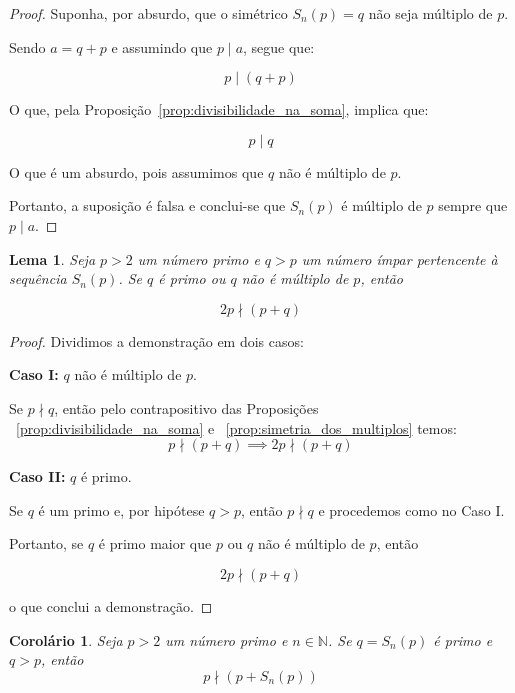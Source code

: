 \documentclass[a4paper,11pt]{article}
\newtheorem{lemma}[theorem]{Lema}
\newtheorem{corollary}[theorem]{Corolário}
\theoremstyle{definition}
\theoremstyle{remark}
\begin{document}
\begin{otherlanguage}{brazil}
	\begin{proof}
		Suponha, por absurdo, que o simétrico \(S_n(p) = q\) não seja múltiplo de \(p\). 
		
		Sendo \(a = q + p\) e assumindo que \(p \mid a\), segue que:
		
		\[
		p \mid (q + p)
		\]
		
		O que, pela Proposição~\ref{prop:divisibilidade_na_soma}, implica que:
		
		\[
		p \mid q
		\]
		
		O que é um absurdo, pois assumimos que \(q\) não é múltiplo de \(p\).
		
		Portanto, a suposição é falsa e conclui-se que \(S_n(p)\) é múltiplo de \(p\) sempre que \(p \mid a\).
	\end{proof}
	
	\begin{lemma}\label{lema:multip}
		Seja \(p > 2\) um número primo e \(q > p\) um número ímpar pertencente à sequência \(S_n(p)\). Se \(q\) é primo ou \(q\) não é múltiplo de \(p\), então
		
		\[
		2p \nmid (p + q)
		\]
	\end{lemma}
	\begin{proof}
		Dividimos a demonstração em dois casos:
		
		\textbf{Caso I:} \(q\) não é múltiplo de \(p\).
		
		Se \(p \nmid q \), então pelo contrapositivo das  Proposições ~\ref{prop:divisibilidade_na_soma} e ~\ref{prop:simetria_dos_multiplos} temos:
		\[
		 p \nmid (p + q) \implies 2p \nmid (p + q)
		\] 
		
		\textbf{Caso II:} \(q\) é primo.
		
		Se \(q\) é um primo e, por hipótese \(q > p\), então \(p \nmid q \) e procedemos como no Caso I.
		
		Portanto, se \(q\) é primo maior que \(p\) ou \(q\) não é múltiplo de \(p\), então 
		
		\[
		2p \nmid (p + q)
		\]
		
		o que conclui a demonstração.
		
	\end{proof}
	
	\begin{corollary}
		Seja \(p > 2\) um número primo e \(n \in \mathbb{N}\). Se \(q=S_n(p)\) é primo e \(q > p\), então
		\[
		p \nmid (p + S_n(p))
		\]
		
	\end{corollary}
	

\end{otherlanguage}
\end{document}

